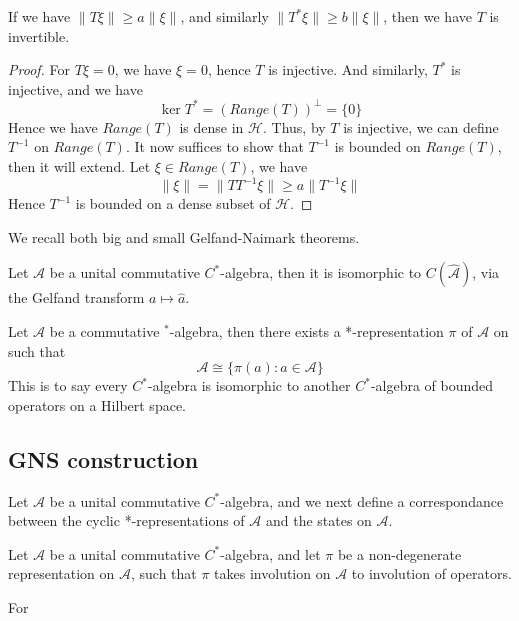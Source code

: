 \begin{proposition}
    If we have $\|T\xi\|\geq a\|\xi\|$, and similarly $\|T^*\xi\|\geq b\|\xi\|$, then we have $T$ is invertible.
\end{proposition}
\begin{proof}
    For $T\xi=0$, we have $\xi=0$, hence $T$ is injective. And similarly, $T^*$ is injective, and we have
    \begin{equation*}
        \ker T^*=(Range(T))^\perp=\{0\}
    \end{equation*}
    Hence we have $Range(T)$ is dense in $\mathcal{H}$. Thus, by $T$ is injective, we can define $T^{-1}$ on $Range(T)$. It now suffices to show that $T^{-1}$ is bounded on $Range(T)$, then it will extend. Let $\xi\in Range(T)$, we have
    \begin{equation*}
        \|\xi\|=\|TT^{-1}\xi\|\geq a\|T^{-1}\xi\|
    \end{equation*}
    Hence $T^{-1}$ is bounded on a dense subset of $\mathcal{H}$.
\end{proof}

We recall both big and small Gelfand-Naimark theorems.
\begin{theorem}
    Let $\mathcal{A}$ be a unital commutative $C^*$-algebra, then it is isomorphic to $C(\widehat{\mathcal{A}})$, via the Gelfand transform $a\mapsto\widehat{a}$.
\end{theorem}

\begin{theorem}
    Let $\mathcal{A}$ be a commutative $^*$-algebra, then there exists a *-representation $\pi$ of $\mathcal{A}$ on such that 
    \begin{equation*}
        \mathcal{A}\cong \{\pi(a): a\in\mathcal{A}\}
    \end{equation*}
    This is to say every $C^*$-algebra is isomorphic to another $C^*$-algebra of bounded operators on a Hilbert space.
\end{theorem}

\subsection{GNS construction}
Let $\mathcal{A}$ be a unital commutative $C^*$-algebra, and we next define a correspondance between the cyclic *-representations of $\mathcal{A}$ and the states on $\mathcal{A}$.
\begin{definition}[*-representation]
    Let $\mathcal{A}$ be a unital commutative $C^*$-algebra, and let $\pi$ be a non-degenerate representation on $\mathcal{A}$, such that $\pi$ takes involution on $\mathcal{A}$ to involution of operators.
\end{definition}
\begin{note}
    For 
\end{note}

